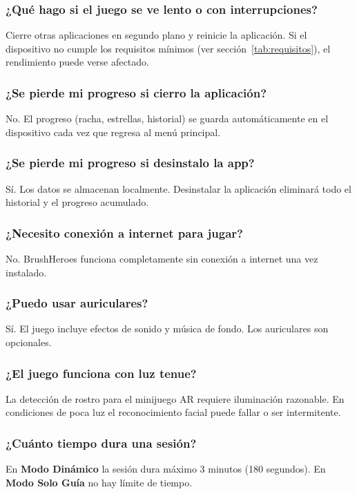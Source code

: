 \documentclass[12pt, a4paper]{article}
\begin{document}
\subsubsection*{¿Qué hago si el juego se ve lento o con interrupciones?}
Cierre otras aplicaciones en segundo plano y reinicie la aplicación. Si el dispositivo no
cumple los requisitos mínimos (ver sección~\ref{tab:requisitos}), el rendimiento puede verse afectado.

\subsubsection*{¿Se pierde mi progreso si cierro la aplicación?}
No. El progreso (racha, estrellas, historial) se guarda automáticamente en el dispositivo
cada vez que regresa al menú principal.

\subsubsection*{¿Se pierde mi progreso si desinstalo la app?}
Sí. Los datos se almacenan localmente. Desinstalar la aplicación eliminará todo el
historial y el progreso acumulado.

\subsubsection*{¿Necesito conexión a internet para jugar?}
No. BrushHeroes funciona completamente sin conexión a internet una vez instalado.

\subsubsection*{¿Puedo usar auriculares?}
Sí. El juego incluye efectos de sonido y música de fondo. Los auriculares son opcionales.

\subsubsection*{¿El juego funciona con luz tenue?}
La detección de rostro para el minijuego AR requiere iluminación razonable. En condiciones
de poca luz el reconocimiento facial puede fallar o ser intermitente.

\subsubsection*{¿Cuánto tiempo dura una sesión?}
En \textbf{Modo Dinámico} la sesión dura máximo 3 minutos (180 segundos).
En \textbf{Modo Solo Guía} no hay límite de tiempo.
\end{document}
